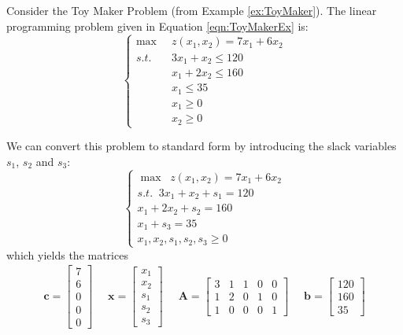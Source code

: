 \begin{example} Consider the Toy Maker Problem (from Example \ref{ex:ToyMaker}). The linear programming problem given in Equation \ref{eqn:ToyMakerEx} is:
\begin{displaymath}
\left\{
\begin{aligned}
\max\;\;& z(x_1,x_2) = 7x_1 + 6x_2\\
s.t.\;\;&  3x_1 + x_2 \leq 120\\
& x_1 + 2x_2 \leq 160\\
& x_1 \leq 35\\
& x_1 \geq 0\\
& x_2 \geq 0
\end{aligned}
\right.
\end{displaymath}

We can convert this problem to standard form by introducing the slack variables $s_1$, $s_2$ and $s_3$:
\begin{displaymath}
\left\{
\begin{aligned}
\max\;\; z(x_1,x_2) = 7x_1 + 6x_2\\
s.t.\;\; 3x_1 + x_2 + s_1 = 120\\
 x_1 + 2x_2 + s_2 = 160\\
 x_1 + s_3 = 35\\
 x_1,x_2,s_1,s_2,s_3\geq 0
\end{aligned}
\right.
\end{displaymath}
which yields the matrices
\begin{displaymath}
\begin{aligned}
\mathbf{c} = \begin{bmatrix}7\\6\\0\\0\\0\end{bmatrix}\;\; & 
\mathbf{x} = \begin{bmatrix}x_1\\x_2\\s_1\\s_2\\s_3\end{bmatrix}\;\;&
\mathbf{A} = 
\begin{bmatrix} 
3 & 1 & 1 & 0 & 0\\
1 & 2 & 0 & 1 & 0\\
1 & 0 & 0 & 0 & 1
\end{bmatrix}\;\;&
\mathbf{b} = \begin{bmatrix}120\\160\\35\end{bmatrix}

\end{aligned}
\end{displaymath}
\end{example}
